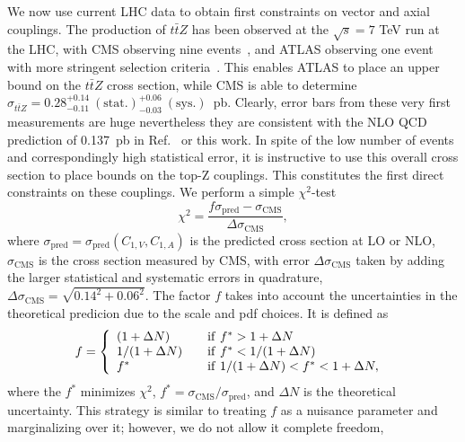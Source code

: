 \documentclass[preprint]{JHEP3}
\def\ttbZ{t\bar{t}Z}
\begin{document}
We now use current LHC data to obtain first constraints on vector and axial couplings. The production of $\ttbZ$ has been observed at the $\sqrt{s}=7$ TeV run at the LHC, 
with CMS observing nine events~\cite{Chatrchyan:2013qca}, and ATLAS observing one event with more stringent selection criteria~\cite{ATLAS-CONF-2012-126}. 
This enables ATLAS to place an upper bound on the $\ttbZ$ cross section, 
while CMS is able to determine $\sigma_{\ttbZ} = 0.28^{+0.14}_{-0.11}~\mathrm{(stat.)}^{+0.06}_{-0.03}~ \mathrm{(sys.)}$~pb. 
Clearly, error bars from these very first measurements are huge nevertheless they are consistent with the NLO QCD prediction of 0.137~pb in Ref.~\cite{Garzelli:2011is} or this work. 
In spite of the low number of events and correspondingly high statistical error, it is instructive to use this overall cross section to place bounds on the top-Z couplings. 
This constitutes the first direct constraints on these couplings.
We perform a simple $\chi^2$-test 
\begin{equation}
\chi^2 = \frac{f \sigma_{\mathrm{pred}} - \sigma_{\mathrm{CMS}}}{\Delta \sigma_{\mathrm{CMS}}},
\end{equation}
where $\sigma_{\mathrm{pred}}=\sigma_{\mathrm{pred}}(C_{1,V},C_{1,A})$ is the predicted cross section at LO or NLO, 
$\sigma_{\mathrm{CMS}}$ is the cross section measured by CMS, with error $\Delta \sigma_{\mathrm{CMS}}$ taken by adding the larger 
statistical and systematic errors in quadrature, $\Delta \sigma_{\mathrm{CMS}}=\sqrt{0.14^2+0.06^2}$. 
The factor $f$ takes into account the uncertainties in the theoretical predicion due to the scale and pdf choices. 
It is defined as~\cite{Baur:2004uw,Baur:2005wi}
 \begin{equation}
f = \left\{ 
\begin{array} {l l}
(1+\Delta N)  & \quad \mathrm{if}~ f^* > 1 + \Delta N \\
1/(1+\Delta N)  & \quad \mathrm{if}~ f^* < 1/(1 + \Delta N) \\
f^* & \quad \mathrm{if}~ 1/(1 + \Delta N) < f^* < 1+\Delta N,
\end{array} \right.\ 
\end{equation}  
where the $f^*$ minimizes $\chi^2$, $f^* = \sigma_{\mathrm{CMS}} / \sigma_{\mathrm{pred}}$, and $\Delta N$ is the theoretical  uncertainty. 
This strategy is similar to treating $f$ as a nuisance parameter and marginalizing over it; however, we do not allow it complete freedom, 
\end{document}
